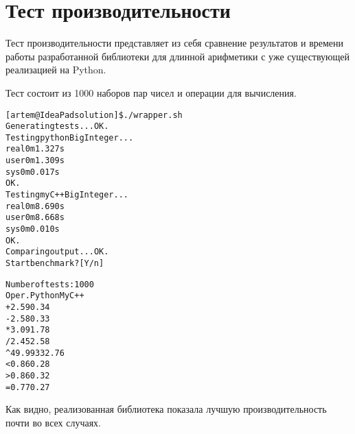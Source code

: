 \section{Тест производительности}

Тест производительности представляет из себя сравнение результатов и времени работы разработанной библиотеки для длинной арифметики с уже существующей реализацией на Python.

Тест состоит из 1000 наборов пар чисел и операции для вычисления.

\begin{alltt}

[artem@IdeaPad solution]\$ ./wrapper.sh 
Generating tests... OK.
Testing python BigInteger... 
real	0m1.327s
user	0m1.309s
sys	0m0.017s
OK.
Testing my C++ BigInteger... 
real	0m8.690s
user	0m8.668s
sys	0m0.010s
OK.
Comparing output... OK.
Start benchmark? [Y/n]

Number of tests: 1000
Oper.   Python  My C++
+       2.59    0.34
-        2.58    0.33
*       3.09    1.78
/       2.45    2.58
^       49.99   332.76
<        0.86    0.28
>        0.86    0.32
=       0.77    0.27


\end{alltt}

Как видно, реализованная библиотека показала лучшую производительность почти во всех случаях.

\pagebreak
